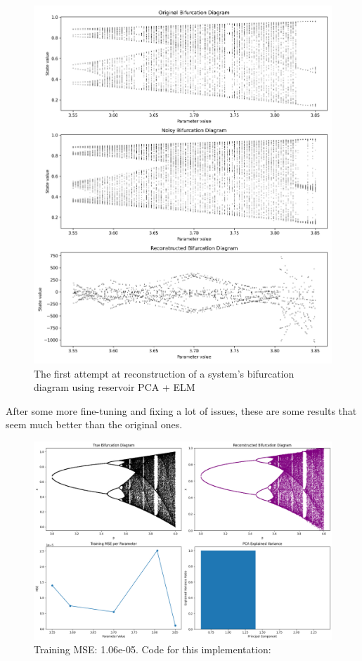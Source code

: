 \documentclass[numbered]{ivt-style/standard}
\begin{document}
\begin{figure}[H]
    \centering
    \includegraphics[width=1\linewidth]{figures/bd_reconstruction_elm.png}
    \caption{The first attempt at reconstruction of a system's bifurcation diagram using reservoir PCA + ELM}
    \label{fig:bifurcation}
\end{figure}

After some more fine-tuning and fixing a lot of issues, these are some results that seem much better than the original ones.

\begin{figure}[H]
    \centering
    \includegraphics[width=1\linewidth]{figures/bd_1_results.png}
    \caption{Training MSE: 1.06e-05. Code for this implementation:}
    \label{fig:bd_1}
\end{figure}
\end{document}
